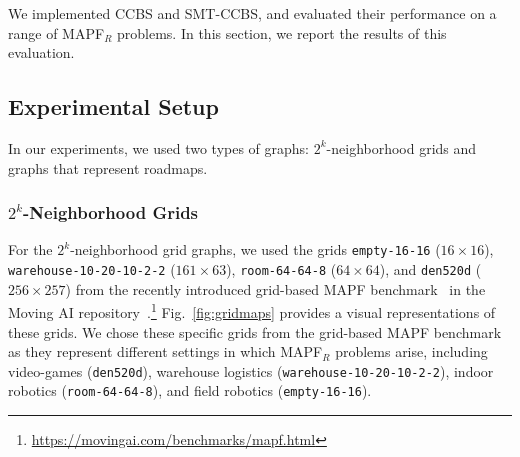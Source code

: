 \documentclass[review]{elsarticle}
\newcommand\roni[1]{\nb{\textbf{Roni:}}{green}{#1}}
\newcommand{\ccbs}{\ac{CCBS}\xspace}
\newcommand{\mapfr}{\ac{MAPF}$_R$\xspace}
\newcommand{\smtccbs}{SMT-CCBS\xspace}
\newcommand{\mapf}{\ac{MAPF}\xspace}
\begin{document}
We implemented \ccbs and \smtccbs, and evaluated their performance on a range of \mapfr problems.
In this section, we report the results of this evaluation. 

\subsection{Experimental Setup}
In our experiments, we used two types of graphs: $2^k$-neighborhood grids \cite{rivera2017grid} and graphs that represent roadmaps.


\subsubsection{$2^k$-Neighborhood Grids} 
For the 
$2^k$-neighborhood grid graphs, we used the grids
\texttt{empty-16-16} ($16 \times 16$), \texttt{warehouse-10-20-10-2-2} ($161 \times 63$), \texttt{room-64-64-8} ($64 \times 64$), and \texttt{den520d} ($256 \times 257$) 
from the recently introduced grid-based \mapf benchmark~\cite{stern2019mapf} in the Moving AI repository~\cite{sturtevant2012benchmarks}.\footnote{\url{https://movingai.com/benchmarks/mapf.html}} 
 Fig.~\ref{fig:gridmaps} provides a visual representations of these grids.
We chose these specific grids from the grid-based \mapf benchmark as they represent different settings in which \mapfr problems arise, including video-games (\texttt{den520d}), warehouse logistics (\texttt{warehouse-10-20-10-2-2}), indoor robotics (\texttt{room-64-64-8}), and field robotics (\texttt{empty-16-16}).
\end{document}
